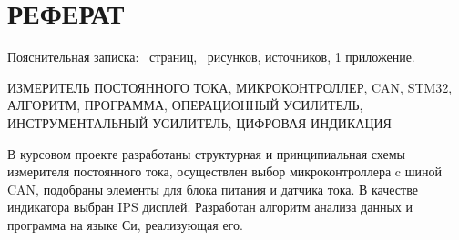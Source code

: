 \begin{sloppypar} %
\newpage %
\section*{РЕФЕРАТ} %

Пояснительная записка: \pageref*{LastPage}~страниц, \totfig~рисунков, источников, 1 приложение.


ИЗМЕРИТЕЛЬ ПОСТОЯННОГО ТОКА, МИКРОКОНТРОЛЛЕР, CAN,  STM32, АЛГОРИТМ, ПРОГРАММА, ОПЕРАЦИОННЫЙ УСИЛИТЕЛЬ, ИНСТРУМЕНТАЛЬНЫЙ УСИЛИТЕЛЬ, ЦИФРОВАЯ ИНДИКАЦИЯ



В курсовом проекте разработаны структурная и принципиальная схемы измерителя постоянного тока,  осуществлен выбор микроконтроллера c шиной CAN, подобраны элементы для блока питания и датчика тока. В качестве индикатора выбран IPS дисплей. Разработан алгоритм анализа данных и программа на языке Си, реализующая его.

\end{sloppypar}

